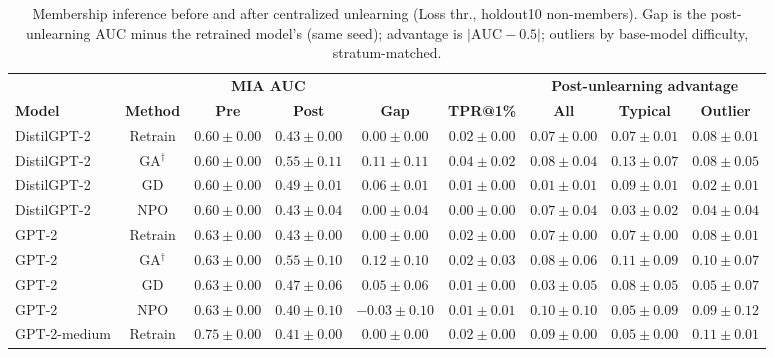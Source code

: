 \begin{table}[t]
\centering
\caption{Membership inference before and after centralized unlearning (Loss thr., holdout10 non-members). Gap is the post-unlearning AUC minus the retrained model's (same seed); advantage is $|\mathrm{AUC}-0.5|$; outliers by base-model difficulty, stratum-matched.}
\label{tab:central-loss-threshold-holdout10}
\footnotesize
\renewcommand{\arraystretch}{1.2}
\setlength{\tabcolsep}{3pt}
\begin{tabular*}{\textwidth}{@{\extracolsep{\fill}}lcccccccc@{}}
\toprule
 & & \multicolumn{2}{c}{\textbf{MIA AUC}} & & & \multicolumn{3}{c}{\textbf{Post-unlearning advantage}} \\
\cmidrule(lr){3-4}\cmidrule(lr){7-9}
\textbf{Model} & \textbf{Method} & \textbf{Pre} & \textbf{Post} & \textbf{Gap} & \textbf{TPR@1\%} & \textbf{All} & \textbf{Typical} & \textbf{Outlier} \\
\midrule
DistilGPT-2 & Retrain & $0.60 \pm 0.00$ & $0.43 \pm 0.00$ & $0.00 \pm 0.00$ & $0.02 \pm 0.00$ & $0.07 \pm 0.00$ & $0.07 \pm 0.01$ & $0.08 \pm 0.01$ \\
DistilGPT-2 & GA$^{\dagger}$ & $0.60 \pm 0.00$ & $0.55 \pm 0.11$ & $0.11 \pm 0.11$ & $0.04 \pm 0.02$ & $0.08 \pm 0.04$ & $0.13 \pm 0.07$ & $0.08 \pm 0.05$ \\
DistilGPT-2 & GD & $0.60 \pm 0.00$ & $0.49 \pm 0.01$ & $0.06 \pm 0.01$ & $0.01 \pm 0.00$ & $0.01 \pm 0.01$ & $0.09 \pm 0.01$ & $0.02 \pm 0.01$ \\
DistilGPT-2 & NPO & $0.60 \pm 0.00$ & $0.43 \pm 0.04$ & $0.00 \pm 0.04$ & $0.00 \pm 0.00$ & $0.07 \pm 0.04$ & $0.03 \pm 0.02$ & $0.04 \pm 0.04$ \\
GPT-2 & Retrain & $0.63 \pm 0.00$ & $0.43 \pm 0.00$ & $0.00 \pm 0.00$ & $0.02 \pm 0.00$ & $0.07 \pm 0.00$ & $0.07 \pm 0.00$ & $0.08 \pm 0.01$ \\
GPT-2 & GA$^{\dagger}$ & $0.63 \pm 0.00$ & $0.55 \pm 0.10$ & $0.12 \pm 0.10$ & $0.02 \pm 0.03$ & $0.08 \pm 0.06$ & $0.11 \pm 0.09$ & $0.10 \pm 0.07$ \\
GPT-2 & GD & $0.63 \pm 0.00$ & $0.47 \pm 0.06$ & $0.05 \pm 0.06$ & $0.01 \pm 0.00$ & $0.03 \pm 0.05$ & $0.08 \pm 0.05$ & $0.05 \pm 0.07$ \\
GPT-2 & NPO & $0.63 \pm 0.00$ & $0.40 \pm 0.10$ & $-0.03 \pm 0.10$ & $0.01 \pm 0.01$ & $0.10 \pm 0.10$ & $0.05 \pm 0.09$ & $0.09 \pm 0.12$ \\
GPT-2-medium & Retrain & $0.75 \pm 0.00$ & $0.41 \pm 0.00$ & $0.00 \pm 0.00$ & $0.02 \pm 0.00$ & $0.09 \pm 0.00$ & $0.05 \pm 0.00$ & $0.11 \pm 0.01$ \\

\end{tabular*}
\end{table}
